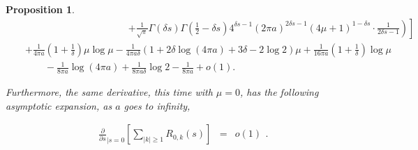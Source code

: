 \documentclass{jams-l}
\newtheorem{proposition}[theorem]{Proposition}
\theoremstyle{definition}
\theoremstyle{remark}
\numberwithin{equation}{section}
\begin{document}
\begin{proposition}
\[\begin{array}{lll}
                        && \qquad \qquad \qquad \qquad \qquad \; \; \left. \left. \scriptstyle + \frac{1}{\sqrt{\pi}} \Gamma \left( \delta s \right) \Gamma \left( \frac{1}{2} - \delta s \right) 4^{\delta s - 1} \left( 2 \pi a \right)^{2 \delta s - 1} \left( 4 \mu + 1 \right)^{1 - \delta s} \cdot \frac{1}{2 \delta s - 1} \right) \right] \\[1em]
                        
                        && \scriptstyle + \frac{1}{4 \pi a} \left( 1 + \frac{1}{\delta} \right) \mu \log \mu - \frac{1}{4 \pi a \delta} \left( 1 + 2 \delta \log \left( 4 \pi a \right) + 3 \delta - 2 \log 2 \right) \mu  + \frac{1}{16 \pi a} \left( 1 + \frac{1}{\delta} \right) \log \mu \\[1em]
                        
                        && \qquad \scriptstyle - \frac{1}{8 \pi a} \log \left( 4 \pi a \right) + \frac{1}{8 \pi a \delta} \log 2 - \frac{1}{8 \pi a} + o \left( 1 \right).
                    \end{array} \]
                
                \noindent Furthermore, the same derivative, this time with $\mu = 0$, has the following asymptotic expansion, as $a$ goes to infinity,
                
                \[ \begin{array}{lll}
                        \frac{\partial}{\partial s}_{\left \vert s = 0 \right.} \left[ \sum\limits_{\left \vert k \right \vert \geqslant 1} R_{0,k} \left( s \right) \right] & = & o \left( 1 \right)
                    \end{array} . \]
                
            \end{proposition}
            
\end{document}
